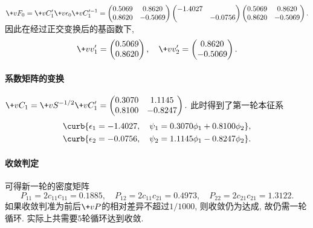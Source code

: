 \documentclass[hidelinks]{ctexart}
\begin{document}
$\displaystyle \+vF_0 = \+vC'_1 \+v\epsilon_0 \+vC_1'^{-1} = \begin{pmatrix}
    0.5069 & 0.8620 \\
    0.8620 & -0.5069
\end{pmatrix} \begin{pmatrix}
    -1.4027 & \\
    & -0.0756
\end{pmatrix} \begin{pmatrix}
    0.5069 & 0.8620 \\
    0.8620 & -0.5069
\end{pmatrix}.$
因此在经过正交变换后的基函数下,
\[ \+vv'_1 = \begin{pmatrix}
    0.5069 \\ 0.8620
\end{pmatrix},\quad \+vv'_2 = \begin{pmatrix}
    0.8620 \\ -0.5069
\end{pmatrix}. \]


\paragraph{系数矩阵的变换} %
\label{par:系数矩阵的变换}

$\displaystyle \+vC_1 = \+vS^{-1/2} \+vC'_1 = \begin{pmatrix}
    0.3070 & 1.1145 \\
    0.8100 & -0.8247
\end{pmatrix}.$
此时得到了第一轮本征系
\begin{align*}
    & \curb{\epsilon_1 = -1.4027,\quad \psi_1 = 0.3070\phi_1 + 0.8100 \phi_2},\\ 
    & \curb{\epsilon_2 = -0.0756,\quad \psi_2 = 1.1145\phi_1 - 0.8247\phi_2}. 
\end{align*}


\paragraph{收敛判定} %
\label{par:收敛判定}

可得新一轮的密度矩阵
\[ P_{11} = 2c_{11}c_{11} = 0.1885,\quad P_{12} = 2c_{11}c_{21} = 0.4973,\quad P_{22} = 2c_{21}c_{21} = 1.3122. \]
如果收敛判准为前后$\+vP$的相对差异不超过$1/1000$, 则收敛仍为达成, 故仍需一轮循环. 实际上共需要$5$轮循环达到收敛.
\end{document}
